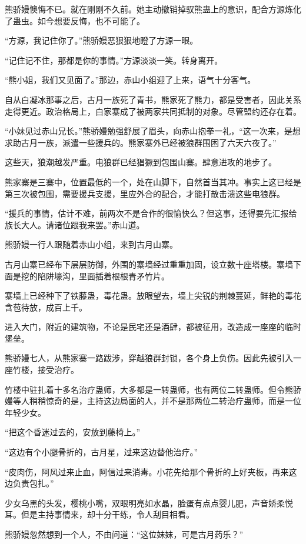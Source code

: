 \begin{this_body}
熊骄嫚懊悔不已。就在刚刚不久前。她主动撤销掉驭熊蛊上的意识，配合方源炼化了蛊虫。如今想要反悔，也不可能了。

“方源，我记住你了。”熊骄嫚恶狠狠地瞪了方源一眼。

“记住记不住，那都是你的事情。”方源淡淡一笑。转身离开。

“熊小姐，我们又见面了。”那边，赤山小组迎了上来，语气十分客气。

自从白凝冰那事之后，古月一族死了青书，熊家死了熊力，都是受害者，因此关系走得更近。政治格局上，白家寨成了被两家共同抵制的对象。尽管盟约还存在着。

“小妹见过赤山兄长。”熊骄嫚勉强舒展了眉头，向赤山抱拳一礼，“这一次来，是想求助古月一族，派遣一些援兵的。熊家寨外已经被狼群围困了六天六夜了。”

这些天，狼潮越发严重。电狼群已经猖獗到包围山寨。肆意进攻的地步了。

熊家寨是三寨中，位置最低的一个，处在山脚下，自然首当其冲。事实上这已经是第三次被包围，需要援兵支援，里应外合的配合，才能打散击溃这些电狼群。

“援兵的事情，估计不难，前两次不是合作的很愉快么？但这事，还得要先汇报给族长大人。请诸位跟我来罢。”赤山道。

熊骄嫚一行人跟随着赤山小组，来到古月山寨。

古月山寨已经布下层层防御，外围的寨墙经过重重加固，设立数十座塔楼。寨墙下面是挖的陷阱壕沟，里面插着根根青矛竹片。

寨墙上已经种下了铁藤蛊，毒花蛊。放眼望去，墙上尖锐的荆棘蔓延，鲜艳的毒花含苞待放，成百上千。

进入大门，附近的建筑物，不论是民宅还是酒肆，都被征用，改造成一座座的临时堡垒。

熊骄嫚七人，从熊家寨一路跋涉，穿越狼群封锁，各个身上负伤。因此先被引入一座竹楼，接受治疗。

竹楼中驻扎着十多名治疗蛊师，大多都是一转蛊师，也有两位二转蛊师。但令熊骄嫚等人稍稍惊奇的是，主持这边局面的人，并不是那两位二转治疗蛊师，而是一位年轻少女。

“把这个昏迷过去的，安放到藤椅上。”

“这边有个小腿骨折的，古月星，过来这边替他治疗。”

“皮肉伤，阿风过来止血，阿信过来消毒。小花先给那个骨折的上好夹板，再来这边负责包扎。”

少女乌黑的头发，樱桃小嘴，双眼明亮如水晶，脸蛋有点点婴儿肥，声音娇柔悦耳。但是主持事情来，却十分干练，令人刮目相看。

熊骄嫚忽然想到一个人，不由问道：“这位妹妹，可是古月药乐？”


\end{this_body}
